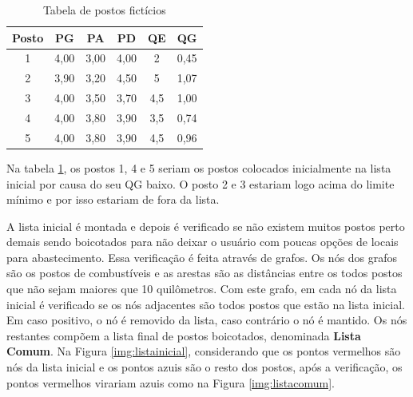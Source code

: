 \begin{table}[H]
\centering
\caption{Tabela de postos fictícios}
\label{tab:exemplo}
\begin{tabular}{|c|c|c|c|c|c|}\hline
\textbf{Posto} & \textbf{PG}   & \textbf{PA}   & \textbf{PD}   & \textbf{QE}  & \textbf{QG}   \\
\hline
1     & 4,00 & 3,00 & 4,00 & 2   & 0,45 \\ \hline
2     & 3,90 & 3,20 & 4,50 & 5   & 1,07 \\ \hline
3     & 4,00 & 3,50 & 3,70 & 4,5 & 1,00 \\ \hline
4     & 4,00 & 3,80 & 3,90 & 3,5 & 0,74 \\ \hline
5     & 4,00 & 3,80 & 3,90 & 4,5 & 0,96 \\ \hline
\end{tabular}
\end{table}

Na tabela \ref{tab:exemplo}, os postos 1, 4 e 5 seriam os postos colocados inicialmente na lista inicial por causa do seu QG baixo. O posto 2 e 3 estariam logo acima do limite mínimo e por isso estariam de fora da lista.

A lista inicial é montada e depois é verificado se não existem muitos postos perto demais sendo boicotados para não deixar o usuário com poucas opções de locais para abastecimento. Essa verificação é feita através de grafos. Os nós dos grafos são os postos de combustíveis e as arestas são as distâncias entre os todos postos que não sejam maiores que 10 quilômetros. Com este grafo, em cada nó da lista inicial é verificado se os nós adjacentes são todos postos que estão na lista inicial. Em caso positivo, o nó é removido da lista, caso contrário o nó é mantido. Os nós restantes compõem a lista final de postos boicotados, denominada \textbf{Lista Comum}. Na Figura \ref{img:listainicial}, considerando que os pontos vermelhos são nós da lista inicial e os pontos azuis são o resto dos postos, após a verificação, os pontos vermelhos virariam azuis como na Figura \ref{img:listacomum}.


